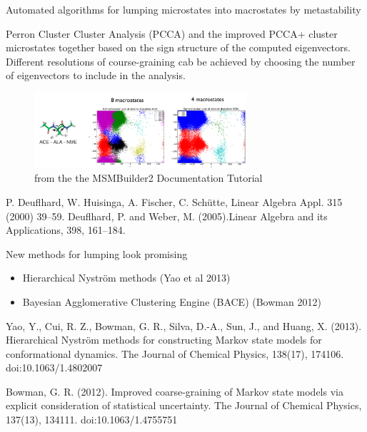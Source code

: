 \documentclass{beamer}
\begin{document}
\begin{frame}{Automated algorithms for lumping microstates into macrostates by metastability}

Perron Cluster Cluster Analysis (PCCA) and the improved PCCA+ cluster microstates together based on the sign structure of the computed eigenvectors.  Different resolutions of course-graining cab be achieved by choosing the number of eigenvectors to include in the analysis. 

\begin{figure}
\includegraphics[width=0.7\textwidth]{PCCA-alanine}
\caption{\label{fig:PCCA-alanine}from the the MSMBuilder2 Documentation Tutorial}
\end{figure}

\tiny
P. Deuflhard, W. Huisinga, A. Fischer, C. Sch\"{u}tte, Linear Algebra Appl. 315 (2000) 39–59.
Deuflhard, P. and  Weber, M. (2005).Linear Algebra and its Applications, 398, 161–184. 
\normalsize

\end{frame}


\begin{frame}{New methods for lumping look promising}



\begin{itemize}
  \item Hierarchical Nystr\"{o}m methods (Yao et al 2013)
  \item Bayesian Agglomerative Clustering Engine (BACE)  (Bowman 2012)
\end{itemize}

\tiny
Yao, Y., Cui, R. Z., Bowman, G. R., Silva, D.-A., Sun, J., and  Huang, X. (2013). Hierarchical Nystr\"{o}m methods for constructing Markov state models for conformational dynamics. The Journal of Chemical Physics, 138(17), 174106. doi:10.1063/1.4802007

Bowman, G. R. (2012). Improved coarse-graining of Markov state models via explicit consideration of statistical uncertainty. The Journal of Chemical Physics, 137(13), 134111. doi:10.1063/1.4755751
\normalsize

\end{frame}
\end{document}
